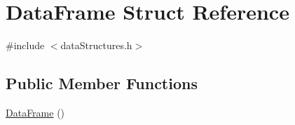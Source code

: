 \hypertarget{structDataFrame}{}\section{Data\+Frame Struct Reference}
\label{structDataFrame}


{\ttfamily \#include $<$data\+Structures.\+h$>$}

\subsection*{Public Member Functions}
\begin{DoxyCompactItemize}
\item 
\hyperlink{structDataFrame_a69a9dc47b7506b8062fd34aedacbf579}{Data\+Frame} ()
\end{DoxyCompactItemize}
